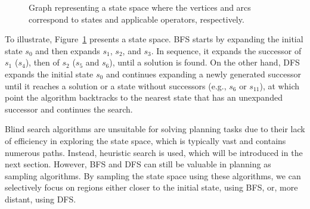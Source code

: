 \begin{figure}[t]
    \caption[Graph representing a state space.]{Graph representing a state space where the vertices and arcs correspond to states and applicable operators, respectively.}
    \label{fig:statespace}
    \addvspace{\baselineskip}
    \centering
\end{figure}

To illustrate, Figure~\ref{fig:statespace} presents a state space. BFS starts by expanding the initial state $s_0$ and then expands $s_1$, $s_2$, and $s_3$. In sequence, it expands the successor of $s_1$ ($s_4$), then of $s_2$ ($s_5$ and $s_6$), until a solution is found. On the other hand, DFS expands the initial state $s_0$ and continues expanding a newly generated successor until it reaches a solution or a state without successors (e.g., $s_6$ or $s_{11}$), at which point the algorithm backtracks to the nearest state that has an unexpanded successor and continues the search.

Blind search algorithms are unsuitable for solving planning tasks due to their lack of efficiency in exploring the state space, which is typically vast and contains numerous paths. Instead, heuristic search is used, which will be introduced in the next section. However, BFS and DFS can still be valuable in planning as sampling algorithms. By sampling the state space using these algorithms, we can selectively focus on regions either closer to the initial state, using BFS, or, more distant, using DFS.

